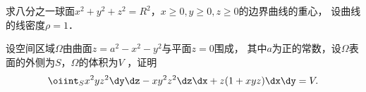 \documentclass[plain,noanswer,medmath]{../../template/jnuexam}
\begin{document}





























\begin{problem}
求八分之一球面$x^2+y^2+z^2=R^2$，$x\ge 0,y\ge 0,z\ge 0$的边界曲线的重心，
设曲线的线密度$\rho=1$．
\end{problem}


\begin{problem}
设空间区域$\Omega$由曲面$z= a^2-x^2-y^2$与平面$z=0$围成，
其中$a$为正的常数，设$\Omega$表面的外侧为$S$，$\Omega$的体积为$V$ ，证明
$$\oiint_S x^2yz^2\dy\dz - xy^2z^2\dz\dx + z(1+xyz)\dx\dy = V.$$
\end{problem}















\end{document}
